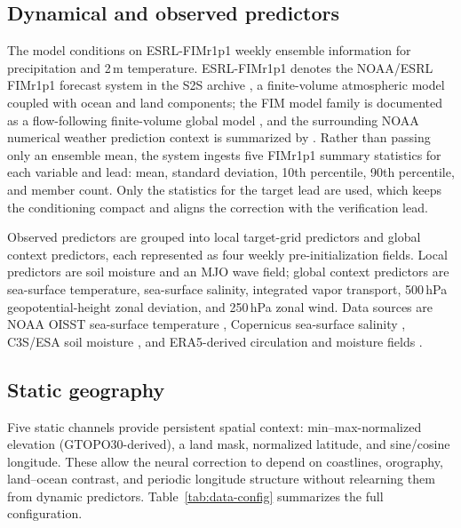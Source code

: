\documentclass[11pt]{article}
\newcommand{\modelname}{ESRL-FIMr1p1}
\newcommand{\modelshort}{FIMr1p1}
\begin{document}
\subsection{Dynamical and observed predictors}

The model conditions on \modelname{} weekly ensemble information for precipitation and 2\,m temperature. \modelname{} denotes the NOAA/ESRL FIMr1p1 forecast system in the S2S archive \citep{Vitart2017}, a finite-volume atmospheric model coupled with ocean and land components; the FIM model family is documented as a flow-following finite-volume global model \citep{Lee2006FIM}, and the surrounding NOAA numerical weather prediction context is summarized by \citet{Benjamin2019NWP}. Rather than passing only an ensemble mean, the system ingests five \modelshort{} summary statistics for each variable and lead: mean, standard deviation, 10th percentile, 90th percentile, and member count. Only the statistics for the target lead are used, which keeps the conditioning compact and aligns the correction with the verification lead.

Observed predictors are grouped into local target-grid predictors and global context predictors, each represented as four weekly pre-initialization fields. Local predictors are soil moisture and an MJO wave field; global context predictors are sea-surface temperature, sea-surface salinity, integrated vapor transport, 500\,hPa geopotential-height zonal deviation, and 250\,hPa zonal wind. Data sources are NOAA OISST sea-surface temperature \citep{Reynolds2007}, Copernicus sea-surface salinity \citep{CopernicusMarineSSS}, C3S/ESA soil moisture \citep{Dorigo2017}, and ERA5-derived circulation and moisture fields \citep{Hersbach2020}.

\subsection{Static geography}

Five static channels provide persistent spatial context: min--max-normalized elevation (GTOPO30-derived), a land mask, normalized latitude, and sine/cosine longitude. These allow the neural correction to depend on coastlines, orography, land--ocean contrast, and periodic longitude structure without relearning them from dynamic predictors. Table~\ref{tab:data-config} summarizes the full configuration.
\end{document}
